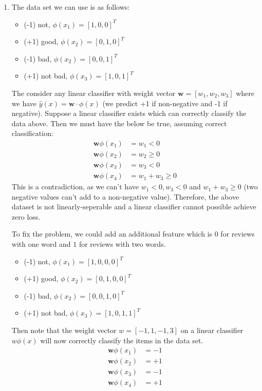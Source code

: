 \documentclass[12pt]{article}
\begin{document}
\begin{enumerate}[label=(\alph*)]
  \item The data set we can use is as follows:
  \begin{itemize}
    \item (-1) not, $\phi(x_1) = [1, 0, 0]^T$
    \item (+1) good, $\phi(x_2) = [0, 1, 0]^T$
    \item (-1) bad, $\phi(x_2) = [0, 0, 1]^T$
    \item (+1) not bad, $\phi(x_3) = [1, 0, 1]^T$
  \end{itemize}
  The consider any linear classifier with weight vector $\bm{w} = [w_1, w_2, w_3]$ where we have $\hat{y}(x) = \bm{w}\cdot\phi(x)$ (we predict +1 if non-negative and -1 if negative). Suppose a linear classifier exists which can correctly classify the data above. Then we must have the below be true, assuming correct classification:
  \begin{align*}
    \bm{w}\phi(x_1) &= w_1 < 0 \\
    \bm{w}\phi(x_2) &= w_2 \geq 0 \\
    \bm{w}\phi(x_3) &= w_3 < 0 \\
    \bm{w}\phi(x_4) &= w_1 + w_3 \geq 0
  \end{align*}
  This is a contradiction, as we can't have $w_1 <0 , w_3 < 0$ and $w_1 + w_3 \geq 0$ (two negative values can't add to a non-negative value). Therefore, the above dataset is not linearly-seperable and a linear classifier cannot possible achieve zero loss.

  To fix the problem, we could add an additional feature which is $0$ for reviews with one word and $1$ for reviews with two words.
  \begin{itemize}
    \item (-1) not, $\phi(x_1) = [1, 0, 0, 0]^T$
    \item (+1) good, $\phi(x_2) = [0, 1, 0, 0]^T$
    \item (-1) bad, $\phi(x_2) = [0, 0, 1, 0]^T$
    \item (+1) not bad, $\phi(x_3) = [1, 0, 1, 1]^T$
  \end{itemize}
  Then note that the weight vector $w = [-1, 1, -1, 3]$ on a linear classifier $w\phi(x)$ will now correctly classify the items in the data set.
  \begin{align*}
    \bm{w}\phi(x_1) &= -1 \\
    \bm{w}\phi(x_2) &= +1 \\
    \bm{w}\phi(x_3) &= -1 \\
    \bm{w}\phi(x_4) &= +1
  \end{align*}
\end{enumerate}
\end{document}
